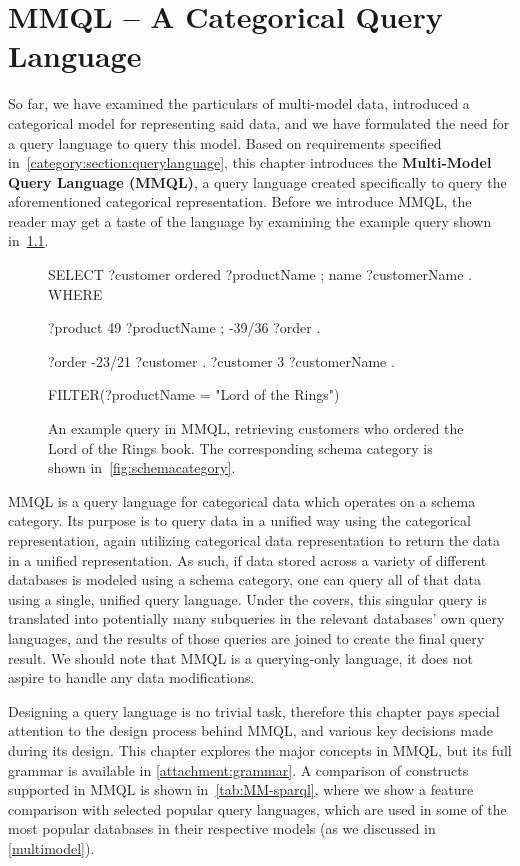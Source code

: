\chapter{MMQL -- A Categorical Query Language}
\label{mmql}

So far, we have examined the particulars of multi-model data, introduced a categorical model for representing said data, and we have formulated the need for a query language to query this model.
Based on requirements specified in~\cref{category:section:querylanguage}, this chapter introduces the \textbf{Multi-Model Query Language (MMQL)}, a query language created specifically to query the aforementioned categorical representation.
Before we introduce MMQL, the reader may get a taste of the language by examining the example query shown in~\cref{mmql:figure:example}.

\begin{figure}[ht]
\begin{code}
SELECT {
    ?customer ordered ?productName ;
        name ?customerName .
}
WHERE {
    ?product 49 ?productName ;
        -39/36 ?order .
    
    ?order -23/21 ?customer .
    ?customer 3 ?customerName .

    FILTER(?productName = "Lord of the Rings")
}
\end{code}
\caption{An example query in MMQL, retrieving customers who ordered the Lord of the Rings book. The corresponding schema category is shown in~\cref{fig:schemacategory}.}\label{mmql:figure:example}
\end{figure}

MMQL is a query language for categorical data which operates on a schema category.
Its purpose is to query data in a unified way using the categorical representation, again utilizing categorical data representation to return the data in a unified representation.
As such, if data stored across a variety of different databases is modeled using a schema category, one can query all of that data using a single, unified query language.
Under the covers, this singular query is translated into potentially many subqueries in the relevant databases' own query languages, and the results of those queries are joined to create the final query result.
We should note that MMQL is a querying-only language, it does not aspire to handle any data modifications.

Designing a query language is no trivial task, therefore this chapter pays special attention to the design process behind MMQL, and various key decisions made during its design.
This chapter explores the major concepts in MMQL, but its full grammar is available in \cref{attachment:grammar}.
A comparison of constructs supported in MMQL is shown in~\cref{tab:MM-sparql}, where we show a feature comparison with selected popular query languages, which are used in some of the most popular databases in their respective models (as we discussed in \cref{multimodel}).

